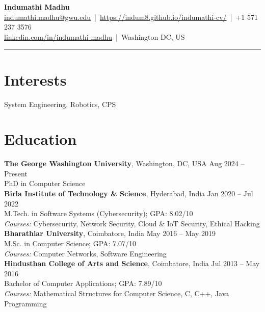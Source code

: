 \documentclass[a4paper,11pt]{article}
\begin{document}
\begin{center}
    {\LARGE \textbf{Indumathi Madhu}} \\
    \vspace{4pt}
    \href{mailto:indumathi.madhu@gwu.edu}{indumathi.madhu@gwu.edu} \,|\,
    \href{https://indum8.github.io/indumathi-cv/}{https://indum8.github.io/indumathi-cv/} \,|\,
    +1 571 237 3576 \\
    \href{https://www.linkedin.com/in/indumathi-madhu/}{linkedin.com/in/indumathi-madhu} \,|\,
    Washington DC, US
\end{center}
\noindent\rule{\textwidth}{0.4pt} %

\section*{Interests}
System Engineering, Robotics, CPS


\section*{Education}

\noindent
\textbf{The George Washington University}, Washington, DC, USA \hfill Aug 2024 -- Present \\
PhD in Computer Science \\[6pt]
\noindent
\textbf{Birla Institute of Technology \& Science}, Hyderabad, India \hfill Jan 2020 -- Jul 2022 \\
M.Tech. in Software Systems (Cybersecurity); GPA: 8.02/10 \\
\textit{Courses:} Cybersecurity, Network Security, Cloud \& IoT Security, Ethical Hacking \\[6pt]
\noindent
\textbf{Bharathiar University}, Coimbatore, India \hfill May 2016 -- May 2019 \\
M.Sc. in Computer Science; GPA: 7.07/10 \\
\textit{Courses:} Computer Networks, Software Engineering \\[6pt]
\noindent
\textbf{Hindusthan College of Arts and Science}, Coimbatore, India \hfill Jul 2013 -- May 2016 \\
Bachelor of Computer Applications; GPA: 7.89/10 \\
\textit{Courses:} Mathematical Structures for Computer Science, C, C++, Java Programming
\end{document}

